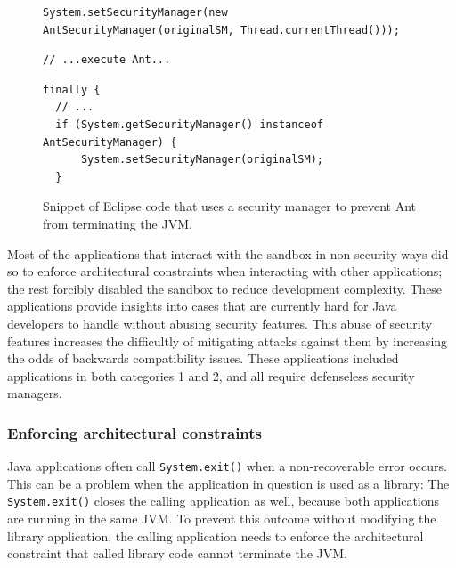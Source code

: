 \documentclass{sig-alternate}
\begin{document}
\begin{figure}
\begin{lstlisting}[firstnumber=691]
System.setSecurityManager(new AntSecurityManager(originalSM, Thread.currentThread()));
\end{lstlisting}
\vspace{-0.3cm}
\begin{lstlisting}[firstnumber=703]
// ...execute Ant...
\end{lstlisting}
\vspace{-0.3cm}
\begin{lstlisting}[firstnumber=723]
finally {
  // ...
  if (System.getSecurityManager() instanceof AntSecurityManager) { 
      System.setSecurityManager(originalSM); 
  }
\end{lstlisting}\vspace{-0.3cm}
\caption{Snippet of Eclipse code that uses a security manager to prevent Ant\label{fig:Eclipse-snippet}
from terminating the JVM.}
\end{figure}

Most of the applications that interact with the sandbox in
non-security ways did so to enforce architectural constraints when interacting with
other applications; the rest forcibly disabled the sandbox to reduce development
complexity. These applications provide insights into cases that are currently
hard for Java developers to handle without abusing security features. This abuse
of security features increases the difficultly of mitigating attacks against
them by increasing the odds of backwards compatibility issues.  These applications
included applications in both categories 1 and 2, and all require defenseless security managers.

\subsubsection{Enforcing architectural constraints}

Java applications often call \texttt{System.exit()} when a non-recoverable
error occurs. This can be a problem when the application in question is 
used as a library: The \texttt{System.exit()} closes the calling
application as well, because both applications
are running in the same JVM. 
To prevent this outcome without modifying the library application,
the calling application needs to enforce the architectural constraint
that called library code cannot terminate the JVM. 
\end{document}
